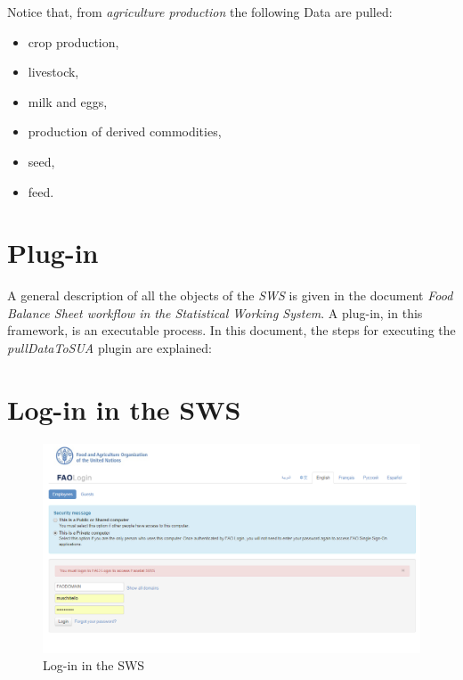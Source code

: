 \documentclass[]{article}
\providecommand{\tightlist}{%
  \setlength{\itemsep}{0pt}\setlength{\parskip}{0pt}}
\begin{document}
Notice that, from \emph{agriculture production} the following Data are
pulled:

\begin{itemize}
\tightlist
\item
  crop production,
\item
  livestock,
\item
  milk and eggs,
\item
  production of derived commodities,
\item
  seed,
\item
  feed.
\end{itemize}

\section*{Plug-in}\label{plug-in}

A general description of all the objects of the \emph{SWS} is given in
the document \emph{Food Balance Sheet workflow in the Statistical
Working System}. A plug-in, in this framework, is an executable process.
In this document, the steps for executing the \emph{pullDataToSUA}
plugin are explained:

\section{Log-in in the SWS}\label{log-in-in-the-sws}

\begin{figure}[H]

{\centering \includegraphics[width=1\linewidth]{images/pullData/02_swsLogin} 

}

\caption{\label{fig:f2}Log-in in the SWS}\label{fig:f2}
\end{figure}
\end{document}
